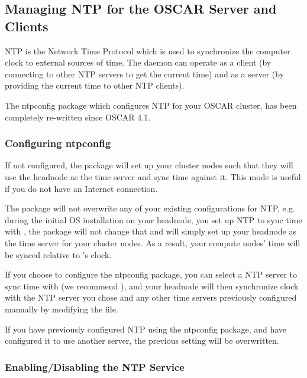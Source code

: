 %
%
%

\subsection{Managing NTP for the OSCAR Server and Clients}
\label{app:ntp-overview}

NTP is the Network Time Protocol which is used to synchronize the
computer clock to external sources of time.  The  daemon
can operate as a client (by connecting to other NTP servers to get the
current time) and as a server (by providing the current time to other
NTP clients).

The ntpconfig package which configures NTP for your OSCAR cluster,
has been completely re-written since OSCAR 4.1.

\subsubsection{Configuring ntpconfig}

If not configured, the package will set
up your cluster nodes such that they will use the headnode as the time 
server and sync time against it.  This mode is useful if you do not 
have an Internet connection.

The package will not overwrite any of your existing configurations for
NTP, e.g. during the initial OS installation on your
headnode, you set up NTP to sync time with , the
package will not change that and will simply set up your headnode as
the time server for your cluster nodes.  As a result, your compute
nodes' time will be synced relative to 's clock.

If you choose to configure the ntpconfig package, you can select a
NTP server to sync time with (we recommend ), and your
headnode will then synchronize clock with the NTP server you chose and
any other time servers previously configured manually by modifying the
 file.

If you have previously configured NTP using the ntpconfig package, 
and have configured it to use another server, the previous setting
will be overwritten.

\subsubsection{Enabling/Disabling the NTP Service}

